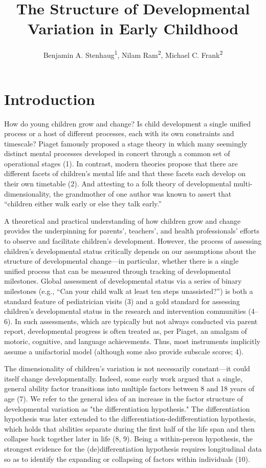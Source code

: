 \documentclass[man]{apa7}
\title{The Structure of Developmental Variation in Early Childhood}
\author{Benjamin A. Stenhaug\textsuperscript{1}, Nilam Ram\textsuperscript{2}, Michael C. Frank\textsuperscript{2}}
\date{}
\affiliation{\vspace{0.5cm}\textsuperscript{1} The Graduate School of Education, Stanford University\\\textsuperscript{2} Department of Psychology, Stanford University}
\begin{document}
\maketitle

\hypertarget{intro}{%
\section{Introduction}\label{intro}}

How do young children grow and change? Is child development a single
uniﬁed process or a host of different processes, each with its own
constraints and timescale? Piaget famously proposed a stage theory in
which many seemingly distinct mental processes developed in concert
through a common set of operational stages (1). In contrast, modern
theories propose that there are different facets of children's mental
life and that these facets each develop on their own timetable (2). And attesting to a folk theory of developmental multi-dimensionality, the
grandmother of one author was known to assert that
``children either walk early or else they talk early.''

A theoretical and practical understanding of how children grow and change
provides the underpinning for parents', teachers', and health professionals'
efforts to observe and facilitate children's development. However, the process of assessing
children's developmental status critically depends on our assumptions
about the structure of developmental change---in particular, whether
there is a single uniﬁed process that can be measured through tracking
of developmental milestones. Global assessment of developmental status
via a series of binary milestones (e.g., ``Can your child walk at least
ten steps unassisted?'') is both a standard feature of pediatrician
visits (3) and a gold standard for assessing children's developmental
status in the research and intervention communities (4--6). In such
assessments, which are typically but not always conducted via parent
report, developmental progress is often treated as, per Piaget, an
amalgam of motoric, cognitive, and language achievements. Thus, most
instruments implicitly assume a unifactorial model (although some also
provide subscale scores; 4).

The dimensionality of children's variation is not necessarily constant---it could itself change developmentally.
Indeed, some early work argued that a single, general
ability factor transitions into multiple factors between 8 and 18 years of age
(7). We refer to the general idea of an increase in the factor structure of developmental variation as "the differentiation hypothesis." The differentiation hypothesis was later extended to the
differentiation-dedifferentiation hypothesis, which holds that abilities
separate during the first half of the life span and then collapse back
together later in life (8, 9). Being a within-person hypothesis, the
strongest evidence for the (de)differentiation hypothesis requires
longitudinal data so as to identify the expanding or collapsing of
factors within individuals (10).
\end{document}
